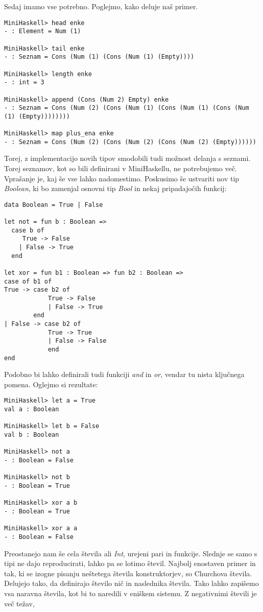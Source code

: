 \documentclass[12pt,a4paper,openany]{book}
\begin{document}
Sedaj imamo vse potrebno. Poglejmo, kako deluje naš primer.
\begin{lstlisting}
MiniHaskell> head enke
- : Element = Num (1)

MiniHaskell> tail enke
- : Seznam = Cons (Num (1) (Cons (Num (1) (Empty))))

MiniHaskell> length enke
- : int = 3

MiniHaskell> append (Cons (Num 2) Empty) enke
- : Seznam = Cons (Num (2) (Cons (Num (1) (Cons (Num (1) (Cons (Num (1) (Empty))))))))

MiniHaskell> map plus_ena enke
- : Seznam = Cons (Num (2) (Cons (Num (2) (Cons (Num (2) (Empty))))))
\end{lstlisting}
Torej, z implementacijo novih tipov smodobili tudi možnost delanja s seznami. Torej seznamov, kot so bili definirani v MiniHaskellu, ne potrebujemo več. Vprašanje je, kaj še vse lahko nadomestimo.
Poskusimo še ustvariti nov tip \emph{Boolean}, ki bo zamenjal osnovni tip \emph{Bool} in nekaj pripadajočih funkcij:
\begin{lstlisting}
data Boolean = True | False
	
let not = fun b : Boolean => 
  case b of 
     True -> False 
    | False -> True 
  end

let xor = fun b1 : Boolean => fun b2 : Boolean =>
case of b1 of
True -> case b2 of
			True -> False
			| False -> True
		end
| False -> case b2 of
			True -> True
			| False -> False
			end
end
\end{lstlisting}
Podobno bi lahko definirali tudi funkciji \emph{and} in \emph{or}, vendar tu nista ključnega pomena. Oglejmo si rezultate:
\begin{lstlisting}
MiniHaskell> let a = True
val a : Boolean

MiniHaskell> let b = False
val b : Boolean

MiniHaskell> not a
- : Boolean = False

MiniHaskell> not b
- : Boolean = True

MiniHaskell> xor a b
- : Boolean = True

MiniHaskell> xor a a
- : Boolean = False
\end{lstlisting}
Preostanejo nam še cela števila ali \emph{Int}, urejeni pari in funkcije. Slednje se samo s tipi ne dajo reproducirati, lahko pa se lotimo števil. Najbolj enostaven primer in tak, ki se izogne pisanju neštetega števila 
konstruktorjev, so Churchova števila. Delujejo tako, da definirajo število nič in naslednika števila. Tako lahko zapišemo vsa naravna števila, kot bi to naredili v eniškem sistemu. Z negativnimi števili je več težav, 
\end{document}
